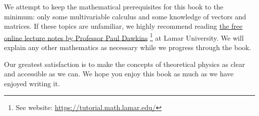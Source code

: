 \documentclass[letterpaper,11pt,twoside,headsepline,bibliography=totoc,index=totoc]{scrbook}
\newcommand{\webtextlink}[2]{\href{#2}{#1} \footnote{See website: \url{#2}}}
\begin{document}
We attempt to keep the mathematical prerequisites for this book to the minimum: only some multivariable calculus and some knowledge of vectors and matrices. If these topics are unfamiliar, we highly recommend reading \webtextlink{the free online lecture notes by Professor Paul Dawkins}{https://tutorial.math.lamar.edu/} at Lamar University. We will explain any other mathematics as necessary while we progress through the book.

Our greatest satisfaction is to make the concepts of theoretical physics as clear and accessible as we can. We hope you enjoy this book as much as we have enjoyed writing it.

\tableofcontents
\mainmatter







\backmatter
\clearpage

\printnomenclature

\printindex
\end{document}
